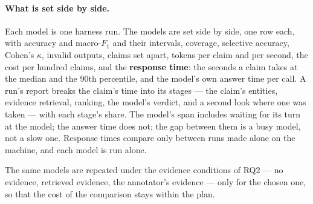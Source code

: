 \paragraph{What is set side by side.} Each model is one harness run.
The models are set side by side, one row each, with accuracy and
macro-$F_1$ and their intervals, coverage, selective accuracy, Cohen's
$\kappa$, invalid outputs, claims set apart, tokens per claim and per
second, the cost per hundred claims, and the \textbf{response time}: the
seconds a claim takes at the median and the 90th percentile, and the
model's own answer time per call. A run's report breaks the claim's time
into its stages --- the claim's entities, evidence retrieval, ranking,
the model's verdict, and a second look where one was taken --- with each
stage's share. The model's span includes waiting for its turn at the
model; the answer time does not; the gap between them is a busy model,
not a slow one. Response times compare only between runs made alone on
the machine, and each model is run alone.

The same models are repeated under the evidence conditions of RQ2 ---
no evidence, retrieved evidence, the annotator's evidence --- only for
the chosen one, so that the cost of the comparison stays within the
plan.
